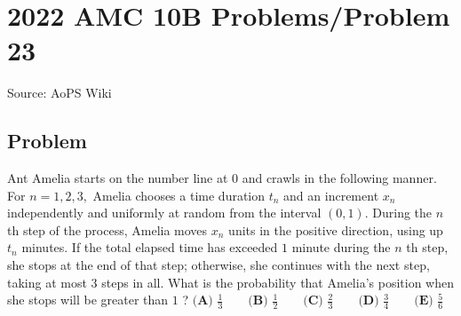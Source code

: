 \documentclass[12pt]{article}
\begin{document}
\section*{{2022 AMC 10B Problems/Problem 23}}
Source: AoPS Wiki

\subsection*{Problem}
Ant Amelia starts on the number line at $0$ and crawls in the following manner. For $n=1,2,3,$ Amelia chooses a time duration $t_n$ and an increment $x_n$ independently and uniformly at random from the interval $(0,1).$ During the $n$ th step of the process, Amelia moves $x_n$ units in the positive direction, using up $t_n$ minutes. If the total elapsed time has exceeded $1$ minute during the $n$ th step, she stops at the end of that step; otherwise, she continues with the next step, taking at most $3$ steps in all. What is the probability that Amelia’s position when she stops will be greater than $1$ ? $\textbf{(A) }\frac{1}{3} \qquad \textbf{(B) }\frac{1}{2} \qquad \textbf{(C) }\frac{2}{3} \qquad \textbf{(D) }\frac{3}{4} \qquad \textbf{(E) }\frac{5}{6}$
\end{document}
